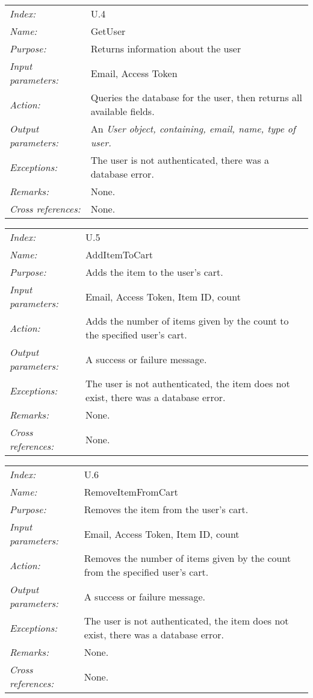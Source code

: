\documentclass[10pt,letter]{article}
\begin{document}
\begin{tabularx}{\textwidth}{l X}
    \it{Index:} & U.4 \\
    \it{Name:} & GetUser \\
    \it{Purpose:} & Returns information about the user \\
    \it{Input parameters:} & Email, Access Token \\
    \it{Action:} & Queries the database for the user, then returns all available fields. \\
    \it{Output parameters:} &  An \it{User} object, containing, email, name, type of user.\\
    \it{Exceptions:} & The user is not authenticated, there was a database error. \\
    \it{Remarks:} & None. \\
    \it{Cross references:} & None. \\
    \hline
\end{tabularx}

\begin{tabularx}{\textwidth}{l X}
    \it{Index:} & U.5 \\
    \it{Name:} & AddItemToCart \\
    \it{Purpose:} & Adds the item to the user's cart. \\
    \it{Input parameters:} & Email, Access Token, Item ID, count \\
    \it{Action:} & Adds the number of items given by the count to the specified user's cart. \\
    \it{Output parameters:} & A success or failure message. \\
    \it{Exceptions:} & The user is not authenticated, the item does not exist, there was a database error. \\
    \it{Remarks:} & None. \\
    \it{Cross references:} & None. \\
    \hline
\end{tabularx}

\begin{tabularx}{\textwidth}{l X}
    \it{Index:} & U.6 \\
    \it{Name:} & RemoveItemFromCart \\
    \it{Purpose:} & Removes the item from the user's cart. \\
    \it{Input parameters:} & Email, Access Token, Item ID, count \\
    \it{Action:} & Removes the number of items given by the count from the specified user's cart. \\
    \it{Output parameters:} & A success or failure message. \\
    \it{Exceptions:} & The user is not authenticated, the item does not exist, there was a database error. \\
    \it{Remarks:} & None. \\
    \it{Cross references:} & None. \\
    \hline
\end{tabularx}
\end{document}
